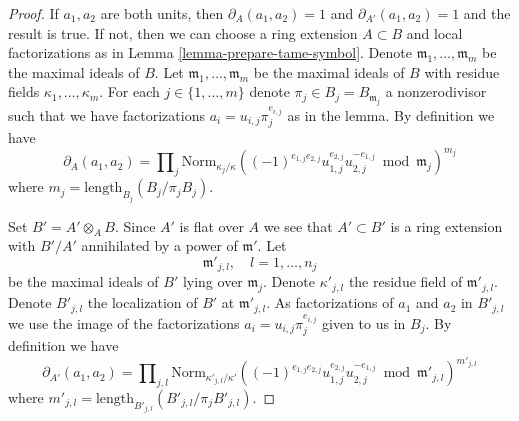 \documentclass[10pt,a4paper]{amsart}
\theoremstyle{plain}
\theoremstyle{definition}
\theoremstyle{remark}
\numberwithin{equation}{subsection}
\begin{document}
\begin{proof}
If $a_1, a_2$ are both units, then $\partial_A(a_1, a_2) = 1$
and $\partial_{A'}(a_1, a_2) = 1$ and the result is true.
If not, then we can choose a ring extension $A \subset B$ and
local factorizations as in Lemma \ref{lemma-prepare-tame-symbol}.
Denote $\mathfrak m_1, \ldots, \mathfrak m_m$
be the maximal ideals of $B$. Let $\mathfrak m_1, \ldots, \mathfrak m_m$
be the maximal ideals of $B$ with residue fields $\kappa_1, \ldots, \kappa_m$.
For each $j \in \{1, \ldots, m\}$ denote $\pi_j \in B_j = B_{\mathfrak m_j}$
a nonzerodivisor such that we have factorizations
$a_i = u_{i, j}\pi_j^{e_{i, j}}$ as in the lemma.
By definition we have
$$
\partial_A(a_1, a_2) = \prod\nolimits_j
\text{Norm}_{\kappa_j/\kappa}
((-1)^{e_{1, j}e_{2, j}}u_{1, j}^{e_{2, j}}u_{2, j}^{-e_{1, j}}
\bmod \mathfrak m_j)^{m_j}
$$
where $m_j = \text{length}_{B_j}(B_j/\pi_j B_j)$.

\medskip\noindent
Set $B' = A' \otimes_A B$. Since $A'$ is flat over $A$ we see
that $A' \subset B'$ is a ring extension with $B'/A'$ annihilated
by a power of $\mathfrak m'$. Let
$$
\mathfrak m'_{j, l},\quad l = 1, \ldots, n_j
$$
be the maximal ideals of $B'$ lying over $\mathfrak m_j$. Denote
$\kappa'_{j, l}$ the residue field of $\mathfrak m'_{j, l}$. Denote
$B'_{j, l}$ the localization of $B'$ at $\mathfrak m'_{j, l}$.
As factorizations of $a_1$ and $a_2$ in $B'_{j, l}$
we use the image of the factorizations
$a_i = u_{i, j} \pi_j^{e_{i, j}}$ given to us in $B_j$.
By definition we have
$$
\partial_{A'}(a_1, a_2) = \prod\nolimits_{j, l}
\text{Norm}_{\kappa'_{j, l}/\kappa'}
((-1)^{e_{1, j}e_{2, j}}u_{1, j}^{e_{2, j}}u_{2, j}^{-e_{1, j}}
\bmod \mathfrak m'_{j, l})^{m'_{j, l}}
$$
where $m'_{j, l} = \text{length}_{B'_{j, l}}(B'_{j, l}/\pi_j B'_{j, l})$.


\end{proof}
\end{document}
